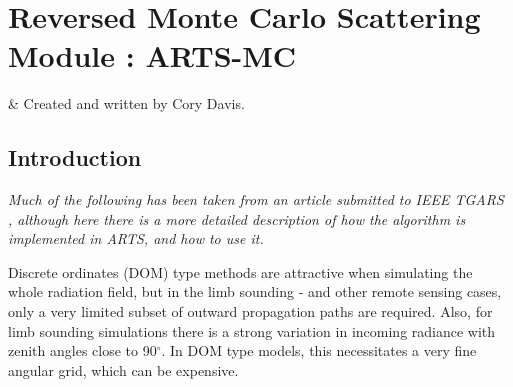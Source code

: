 \graphicspath{{Figs/montecarlo/}}

%
%
\chapter{Reversed Monte Carlo Scattering Module : ARTS-MC}
 \label{sec:montecarlo}


%
%
 & Created and written by Cory Davis.\\
\stophistory


%
%
%

%
%




\section{Introduction}
 \label{sec:montecarlo:intro}

\emph{Much of the following has been taken from an article submitted to IEEE
TGARS \citep{davisetal:04}, although here there is a more detailed description of how the
algorithm is implemented in ARTS, and how to use it.} 

Discrete ordinates (DOM) type methods are attractive
when simulating the whole radiation field, but in the limb sounding -
and other remote sensing cases, only a very limited subset of outward
propagation paths are required. Also, for limb sounding simulations
there is a strong variation in incoming radiance with zenith angles
close to 90$^\circ$.
In DOM type models, this necessitates a very fine angular grid, which can be expensive.

